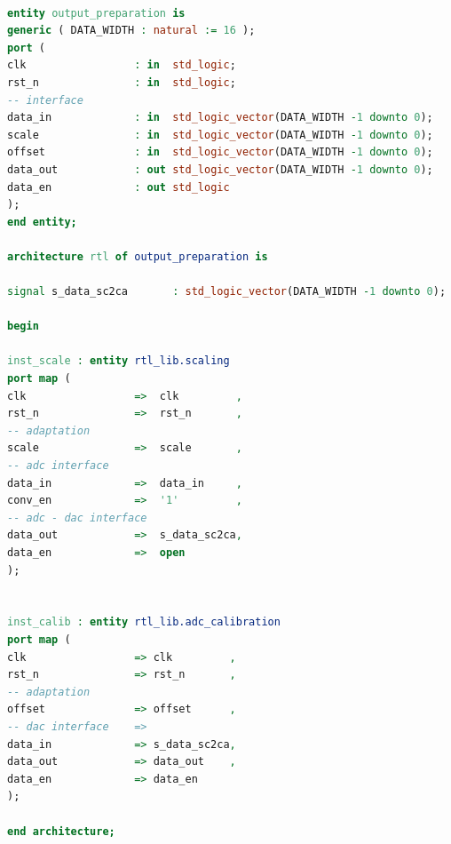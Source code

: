 \clearpage
\begin{lstlisting}[language=VHDL, basicstyle=\ttfamily\scriptsize, lineskip=-1pt,
    caption={Output Prepration (shared between COARSE and VERNIER)},
    label={lst:fpga-outputprep-entity}]

entity output_preparation is
generic ( DATA_WIDTH : natural := 16 );
port (
clk                 : in  std_logic;
rst_n               : in  std_logic;
-- interface
data_in             : in  std_logic_vector(DATA_WIDTH -1 downto 0);
scale               : in  std_logic_vector(DATA_WIDTH -1 downto 0);
offset              : in  std_logic_vector(DATA_WIDTH -1 downto 0);
data_out            : out std_logic_vector(DATA_WIDTH -1 downto 0);
data_en             : out std_logic
);
end entity;

architecture rtl of output_preparation is

signal s_data_sc2ca       : std_logic_vector(DATA_WIDTH -1 downto 0);

begin

inst_scale : entity rtl_lib.scaling
port map (
clk                 =>  clk         ,
rst_n               =>  rst_n       ,
-- adaptation
scale               =>  scale       ,
-- adc interface
data_in             =>  data_in     ,
conv_en             =>  '1'         ,
-- adc - dac interface
data_out            =>  s_data_sc2ca,
data_en             =>  open
);


inst_calib : entity rtl_lib.adc_calibration
port map (
clk                 => clk         ,
rst_n               => rst_n       ,
-- adaptation
offset              => offset      ,
-- dac interface    =>
data_in             => s_data_sc2ca,
data_out            => data_out    ,
data_en             => data_en
);

end architecture;
\end{lstlisting}




